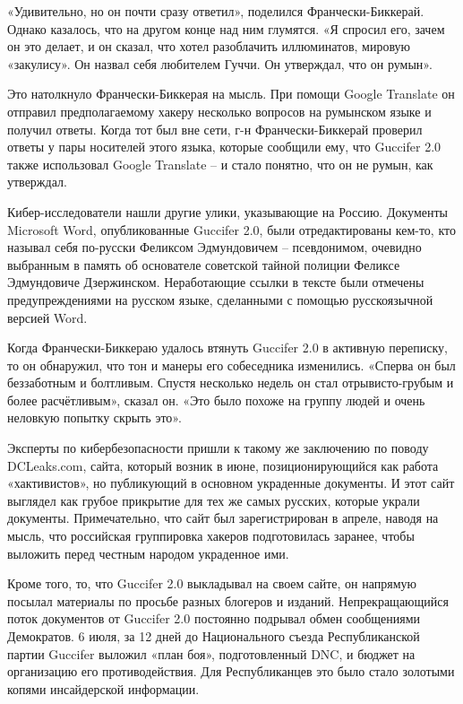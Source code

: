 «Удивительно, но он почти сразу ответил», поделился Франчески-Биккерай.
Однако казалось, что на другом конце над ним глумятся. «Я спросил его,
зачем он это делает, и он сказал, что хотел разоблачить иллюминатов,
мировую «закулису». Он назвал себя любителем Гуччи. Он утверждал, что он
румын».

Это натолкнуло Франчески-Биккерая на мысль. При помощи Google Translate
он отправил предполагаемому хакеру несколько вопросов на румынском языке
и получил ответы. Когда тот был вне сети, г-н Франчески-Биккерай
проверил ответы у пары носителей этого языка, которые сообщили ему, что
Guccifer 2.0 также использовал Google Translate -- и стало понятно, что
он не румын, как утверждал.

Кибер-исследователи нашли другие улики, указывающие на Россию. Документы
Microsoft Word, опубликованные Guccifer 2.0, были отредактированы
кем-то, кто называл себя по-русски Феликсом Эдмундовичем -- псевдонимом,
очевидно выбранным в память об основателе советской тайной полиции
Феликсе Эдмундовиче Дзержинском. Неработающие ссылки в тексте были
отмечены предупреждениями на русском языке, сделанными с помощью
русскоязычной версией Word.

Когда Франчески-Биккераю удалось втянуть Guccifer 2.0 в активную
переписку, то он обнаружил, что тон и манеры его собеседника изменились.
«Сперва он был беззаботным и болтливым. Спустя несколько недель он стал
отрывисто-грубым и более расчётливым», сказал он. «Это было похоже на
группу людей и очень неловкую попытку скрыть это».

Эксперты по кибербезопасности пришли к такому же заключению по поводу
DCLeaks.com, сайта, который возник в июне, позиционирующийся как работа
«хактивистов», но публикующий в основном украденные документы. И этот
сайт выглядел как грубое прикрытие для тех же самых русских, которые
украли документы. Примечательно, что сайт был зарегистрирован в апреле,
наводя на мысль, что российская группировка хакеров подготовилась
заранее, чтобы выложить перед честным народом украденное ими.

Кроме того, то, что Guccifer 2.0 выкладывал на своем сайте, он напрямую
посылал материалы по просьбе разных блогеров и изданий. Непрекращающийся
поток документов от Guccifer 2.0 постоянно подрывал обмен сообщениями
Демократов. 6 июля, за 12 дней до Национального съезда Республиканской
партии Guccifer выложил «план боя», подготовленный DNC, и бюджет на
организацию его противодействия. Для Республиканцев это было стало
золотыми копями инсайдерской информации.

